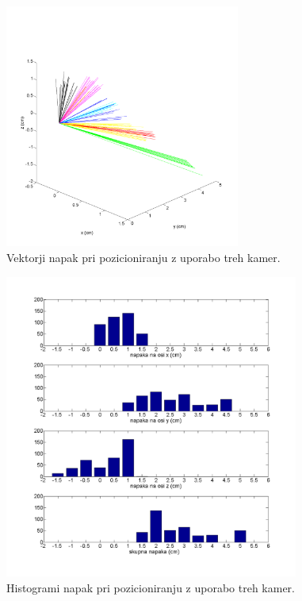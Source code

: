 \documentclass[a4paper, 12pt]{book}
\begin{document}
\begin{figure}
\centering
\includegraphics[height=8cm]{points3errplot.png}
\caption{Vektorji napak pri pozicioniranju z uporabo treh kamer.}
\label{vec3}
\end{figure}
\begin{figure}
\centering
\includegraphics[height=10cm]{points3barplot.png}
\caption{Histogrami napak pri pozicioniranju z uporabo treh kamer.}
\label{bar3}
\end{figure}
\end{document}
